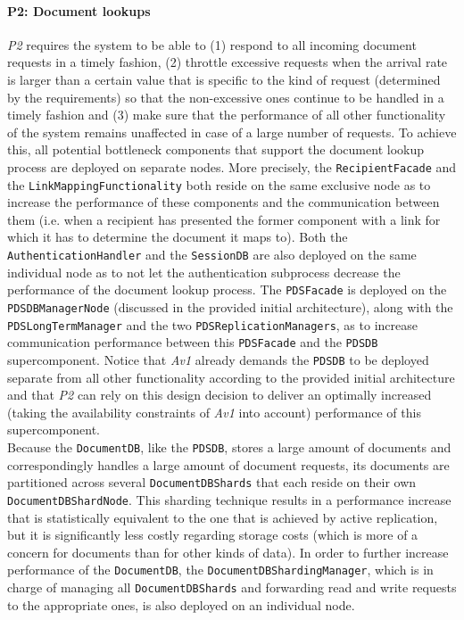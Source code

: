 \documentclass[a4paper,10pt]{article}
\begin{document}
\paragraph{P2: Document lookups}
\textit{P2} requires the system to be able to (1) respond to all incoming document requests in a timely fashion, (2) throttle excessive requests when the arrival rate is larger than a certain value that is specific to the kind of request (determined by the requirements) so that the non-excessive ones continue to be handled in a timely fashion and (3) make sure that the performance of all other functionality of the system remains unaffected in case of a large number of requests. To achieve this, all potential bottleneck components that support the document lookup process are deployed on separate nodes. More precisely, the \texttt{RecipientFacade} and the \texttt{LinkMappingFunctionality} both reside on the same exclusive node as to increase the performance of these components and the communication between them (i.e. when a recipient has presented the former component with a link for which it has to determine the document it maps to). Both the \texttt{AuthenticationHandler} and the \texttt{SessionDB} are also deployed on the same individual node as to not let the authentication subprocess decrease the performance of the document lookup process. The \texttt{PDSFacade} is deployed on the \texttt{PDSDBManagerNode} (discussed in the provided initial architecture), along with the \texttt{PDSLongTermManager} and the two \texttt{PDSReplicationManagers}, as to increase communication performance between this \texttt{PDSFacade} and the \texttt{PDSDB} supercomponent. Notice that \textit{Av1} already demands the \texttt{PDSDB} to be deployed separate from all other functionality according to the provided initial architecture and that \textit{P2} can rely on this design decision to deliver an optimally increased (taking the availability constraints of \textit{Av1} into account) performance of this supercomponent.\\
Because the \texttt{DocumentDB}, like the \texttt{PDSDB}, stores a large amount of documents and correspondingly handles a large amount of document requests, its documents are partitioned across several \texttt{DocumentDBShards} that each reside on their own \texttt{DocumentDBShardNode}. This sharding technique results in a performance increase that is statistically equivalent to the one that is achieved by active replication, but it is significantly less costly regarding storage costs (which is more of a concern for documents than for other kinds of data). In order to further increase performance of the \texttt{DocumentDB}, the \texttt{DocumentDBShardingManager}, which is in charge of managing all \texttt{DocumentDBShards} and forwarding read and write requests to the appropriate ones, is also deployed on an individual node.\\
\end{document}
